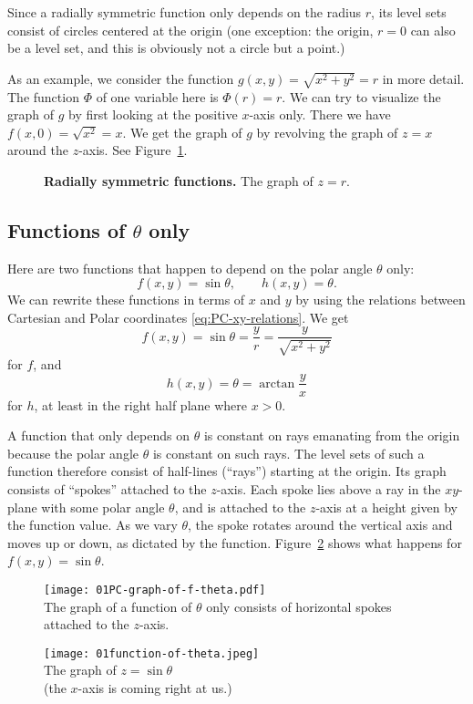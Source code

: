 Since a radially symmetric function only depends on the radius $r$, its level sets
consist of circles centered at the origin (one exception:  the origin, $r=0$ can
also be a level set, and this is obviously not a circle but a point.)

As an example, we consider the function $g(x, y) = \sqrt{x^2+y^2} = r$ in more detail.
The function $\Phi$ of one variable here is $\Phi(r) = r$.  We can try to visualize
the graph of $g$ by first looking at the positive $x$-axis only.  There we have $f(x,
0)=\sqrt{x^2} = x$.  We get the graph of $g$ by revolving the graph of $z=x$ around
the $z$-axis.  See Figure~\ref{fig:graph-of-z-is-r}.
\begin{figure}[t]
  \def\svgwidth{0.6\textwidth}%
  
  \caption{\textbf{Radially symmetric functions.}  The graph of $z=r$.}
  \label{fig:graph-of-z-is-r}
\end{figure}

\subsection{Functions of $\theta$ only} 
\label{sec:functions-in-PC-theta}%
Here are two functions that happen to depend on the polar angle $\theta$ only:
\[
  f(x, y) = \sin\theta, \qquad h(x, y) = \theta.
\]
We can rewrite these functions in terms of $x$ and $y$ by using the relations between
Cartesian and Polar coordinates \eqref{eq:PC-xy-relations}.  We get
\[
  f(x, y) = \sin\theta = \frac{y}{r} = \frac{y}{\sqrt{x^2+y^2}}
\]
for $f$, and 
\[
  h(x,y) = \theta = \arctan \frac{y}{x}
\]
for $h$, at least in the right half plane where $x>0$. 

A function that only depends on $\theta$ is constant on rays emanating from the origin
because the polar angle $\theta$ is constant on such rays. The level sets of such
a function therefore consist of half-lines (``rays'') starting at the origin. Its
graph consists of ``spokes'' attached to the $z$-axis.  Each spoke lies above a ray
in the $xy$-plane with some polar angle $\theta$, and is attached to the $z$-axis at
a height given by the function value.  As we vary $\theta$, the spoke rotates around
the vertical axis and moves up or down, as dictated by the function.
Figure~\ref{fig:graph-of-f-of-theta} shows what happens for $f(x, y) = \sin\theta$.

\begin{figure}[h]
  \begin{minipage}{0.4\textwidth}
    \centering
    \dfnt \texttt{[image: 01PC-graph-of-f-theta.pdf]}\\
    The graph of a function of $\theta$ only consists of horizontal spokes attached to
    the $z$-axis.
  \end{minipage}
  \begin{minipage}{0.55\textwidth}
    \centering
    \dfnt\texttt{[image: 01function-of-theta.jpeg]}\\
    The graph of $z=\sin\theta$\\
    (the $x$-axis is coming right at us.)
  \end{minipage}
  \caption{}
  \label{fig:graph-of-f-of-theta}
\end{figure}

